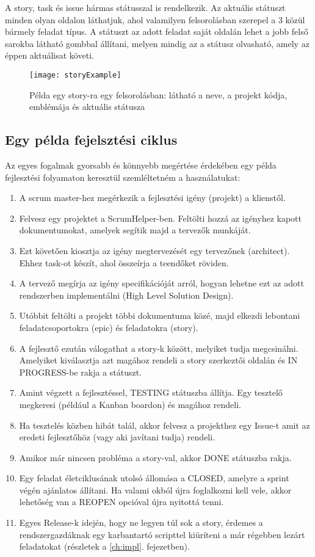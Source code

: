 A story, task és issue hármas státusszal is rendelkezik. Az aktuális státuszt minden olyan oldalon láthatjuk, ahol valamilyen felsorolásban szerepel a 3 közül bármely feladat típus. A státuszt az adott feladat saját oldalán lehet a jobb felső sarokba látható gombbal állítani, melyen mindig az a státusz olvasható, amely az éppen aktuálisat követi.

\begin{figure}[H]
	\centering
	\texttt{[image: storyExample]}
	\caption{Példa egy story-ra egy felsorolásban: látható a neve, a projekt kódja, emblémája és aktuális státusza}
	\label{fig:example-6}
\end{figure}

\subsection{Egy példa fejelsztési ciklus}
\label{example_workflow}

Az egyes fogalmak gyorsabb és könnyebb megértése érdekében egy példa fejlesztési folyamaton keresztül szemléltetném a használatukat:

\begin{enumerate}
	\item A scrum master-hez megérkezik a fejlesztési igény (projekt) a klienstől.
	\item Felvesz egy projektet a ScrumHelper-ben. Feltölti hozzá az igényhez kapott dokumentumokat, amelyek segítik majd a tervezők munkáját.
	\item Ezt követően kiosztja az igény megtervezését egy tervezőnek (architect). Ehhez task-ot készít, ahol összeírja a teendőket röviden.
	\item A tervező megírja az igény specifikációját arról, hogyan lehetne ezt az adott rendszerben implementálni (High Level Solution Design).
	\item Utóbbit feltölti a projekt többi dokumentuma közé, majd elkezdi lebontani feladatcsoportokra (epic) és feladatokra (story).
	\item A fejlesztő ezután válogathat a story-k között, melyiket tudja megcsinálni. Amelyiket kiválasztja azt magához rendeli a story szerkeztői oldalán és IN PROGRESS-be rakja a státuszt.
	\item Amint végzett a fejlesztéssel, TESTING státuszba állítja. Egy tesztelő megkeresi (például a Kanban boardon) és magához rendeli.
	\item Ha tesztelés közben hibát talál, akkor felvesz a projekthez egy Issue-t amit az eredeti fejlesztőhöz (vagy aki javítani tudja) rendeli.
	\item Amikor már nincsen probléma a story-val, akkor DONE státuszba rakja.
	\item Egy feladat életciklusának utolsó állomása a CLOSED, amelyre a sprint végén ajánlatos állítani. Ha valami okból újra foglalkozni kell vele, akkor lehetőség van a REOPEN opcióval újra nyitottá tenni.
	\item Egyes Release-k idején, hogy ne legyen túl sok a story, érdemes a rendszergazdáknak egy karbantartó scripttel kiüríteni a már régebben lezárt feladatokat (részletek a \ref{ch:impl}. fejezetben).
\end{enumerate}

